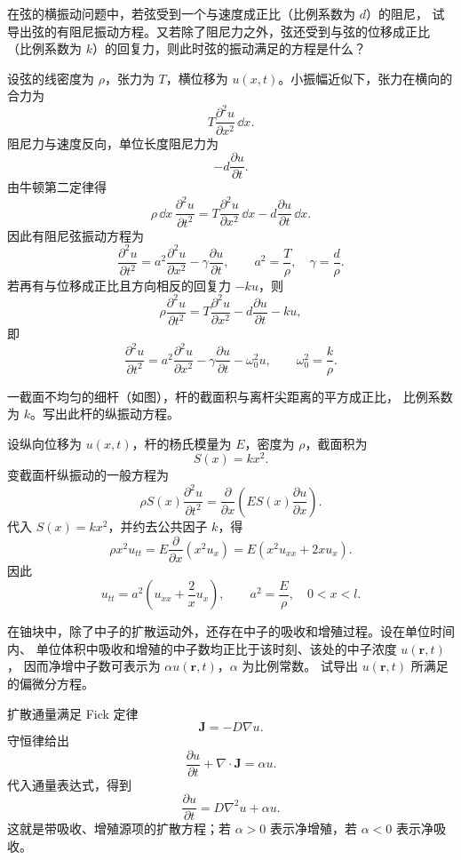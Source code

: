 ﻿


\begin{question}
在弦的横振动问题中，若弦受到一个与速度成正比（比例系数为 \(d\)）的阻尼，
试导出弦的有阻尼振动方程。又若除了阻尼力之外，弦还受到与弦的位移成正比
（比例系数为 \(k\)）的回复力，则此时弦的振动满足的方程是什么？
\begin{solution}
设弦的线密度为 \(\rho\)，张力为 \(T\)，横位移为 \(u(x,t)\)。小振幅近似下，张力在横向的合力为
\[
T\frac{\partial^2u}{\partial x^2}\,\dd{x}.
\]
阻尼力与速度反向，单位长度阻尼力为
\[
-d\frac{\partial u}{\partial t}.
\]
由牛顿第二定律得
\[
\rho\,\dd{x}\,\frac{\partial^2u}{\partial t^2}
=T\frac{\partial^2u}{\partial x^2}\,\dd{x}
-d\frac{\partial u}{\partial t}\,\dd{x}.
\]
因此有阻尼弦振动方程为
\[
\frac{\partial^2u}{\partial t^2}
=a^2\frac{\partial^2u}{\partial x^2}
-\gamma\frac{\partial u}{\partial t},
\qquad
a^2=\frac{T}{\rho},\quad \gamma=\frac{d}{\rho}.
\]
若再有与位移成正比且方向相反的回复力 \(-ku\)，则
\[
\rho\frac{\partial^2u}{\partial t^2}
=T\frac{\partial^2u}{\partial x^2}
-d\frac{\partial u}{\partial t}-ku,
\]
即
\[
\frac{\partial^2u}{\partial t^2}
=a^2\frac{\partial^2u}{\partial x^2}
-\gamma\frac{\partial u}{\partial t}
-\omega_0^2u,
\qquad
\omega_0^2=\frac{k}{\rho}.
\]
\end{solution}
\end{question}

\begin{question}
一截面不均匀的细杆（如图），杆的截面积与离杆尖距离的平方成正比，
比例系数为 \(k\)。写出此杆的纵振动方程。

\begin{solution}
设纵向位移为 \(u(x,t)\)，杆的杨氏模量为 \(E\)，密度为 \(\rho\)，截面积为
\[
S(x)=kx^2.
\]
变截面杆纵振动的一般方程为
\[
\rho S(x)\frac{\partial^2u}{\partial t^2}
=\frac{\partial}{\partial x}
\left(E S(x)\frac{\partial u}{\partial x}\right).
\]
代入 \(S(x)=kx^2\)，并约去公共因子 \(k\)，得
\[
\rho x^2u_{tt}=E\frac{\partial}{\partial x}(x^2u_x)
=E(x^2u_{xx}+2xu_x).
\]
因此
\[
u_{tt}=a^2\left(u_{xx}+\frac{2}{x}u_x\right),
\qquad
a^2=\frac{E}{\rho},\quad 0<x<l.
\]
\end{solution}
\end{question}

\begin{question}
在铀块中，除了中子的扩散运动外，还存在中子的吸收和增殖过程。设在单位时间内、
单位体积中吸收和增殖的中子数均正比于该时刻、该处的中子浓度 \(u(\bm r,t)\)，
因而净增中子数可表示为 \(\alpha u(\bm r,t)\)，\(\alpha\) 为比例常数。
试导出 \(u(\bm r,t)\) 所满足的偏微分方程。
\begin{solution}
扩散通量满足 Fick 定律
\[
\bm J=-D\nabla u.
\]
守恒律给出
\[
\frac{\partial u}{\partial t}+\nabla\cdot\bm J=\alpha u.
\]
代入通量表达式，得到
\[
\frac{\partial u}{\partial t}
=D\nabla^2u+\alpha u.
\]
这就是带吸收、增殖源项的扩散方程；若 \(\alpha>0\) 表示净增殖，若 \(\alpha<0\) 表示净吸收。
\end{solution}
\end{question}

